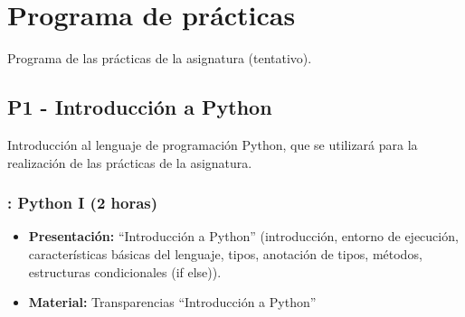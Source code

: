 \documentclass[a4paper,12pt]{article}
\begin{document}
\section{Programa de prácticas}

Programa de las prácticas de la asignatura (tentativo).

\subsection{P1 - Introducción a Python}

Introducción al lenguaje de programación Python, que se utilizará para la realización de las prácticas de la asignatura.

\subsubsection{\lunesA: Python I (2 horas)}
\label{cal:lunesA}

\begin{itemize}
\item \textbf{Presentación:} ``Introducción a Python'' (introducción, entorno de ejecución, características básicas del lenguaje, tipos, anotación de tipos, métodos, estructuras condicionales (if else)).
\item \textbf{Material:} Transparencias ``Introducción a Python''
\end{itemize}
\end{document}
